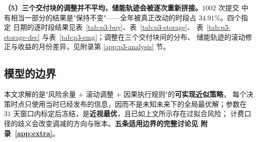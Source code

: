 \textbf{（5）三个交付块的调整并不平均，储能轨迹会被逐次重新拼接。}$1002$ 次提交
中有相当一部分的结果是"保持不变"——全年被真正改动的时段占 $34.91\%$。四个指定
日期的逐时段结果见表~\ref{tab:p3-buy}、表~\ref{tab:p3-storage}、
表~\ref{tab:p3-storage-dec} 与表~\ref{tab:p3-emg}；调整在三个交付块间的分布、
储能轨迹的滚动修正与收益的月份差异，见附录第 \ref{app:p3-analysis} 节。

\subsection{模型的边界}

本文求解的是"风险余量 $+$ 滚动调整 $+$ 因果执行规则"的\textbf{可实现近似策略}，
每个决策时点只使用当时已经发布的信息，因而不是未知未来下的全局最优解；参数在
$31$ 天窗口内标定后冻结，是\textbf{近视最优}，且已如上文所示存在过拟合风险；
计费口径的歧义会改变调减的方向与账本。\textbf{五条适用边界的完整讨论见
附录~\ref{app:extra}}。
